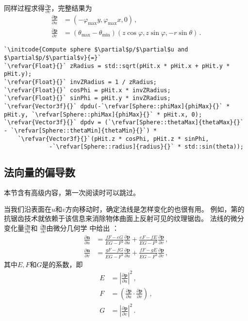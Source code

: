 同样过程求得$\displaystyle\frac{\partial \bm p}{\partial v}$，完整结果为
\begin{align*}
    \frac{\partial \bm p}{\partial u} & =(-\varphi_{\max}y,\varphi_{\max}x,0)\, ,                                  \\
    \frac{\partial \bm p}{\partial v} & =(\theta_{\max}-\theta_{\min})(z\cos\varphi,z\sin\varphi,-r\sin\theta)\, .
\end{align*}
\begin{lstlisting}
`\initcode{Compute sphere $\partial$p/$\partial$u and $\partial$p/$\partial$v}{=}`
`\refvar{Float}{}` zRadius = std::sqrt(pHit.x * pHit.x + pHit.y * pHit.y);
`\refvar{Float}{}` invZRadius = 1 / zRadius;
`\refvar{Float}{}` cosPhi = pHit.x * invZRadius;
`\refvar{Float}{}` sinPhi = pHit.y * invZRadius;
`\refvar{Vector3f}{}` dpdu(-`\refvar[Sphere::phiMax]{phiMax}{}` * pHit.y, `\refvar[Sphere::phiMax]{phiMax}{}` * pHit.x, 0);
`\refvar{Vector3f}{}` dpdv = (`\refvar[Sphere::thetaMax]{thetaMax}{}` - `\refvar[Sphere::thetaMin]{thetaMin}{}`) *
    `\refvar{Vector3f}{}`(pHit.z * cosPhi, pHit.z * sinPhi,
             -`\refvar[Sphere::radius]{radius}{}` * std::sin(theta));
\end{lstlisting}

\subsection{法向量的偏导数}\label{sub:法向量的偏导数}
\begin{remark}
    本节含有高级内容，第一次阅读时可以跳过。
\end{remark}

当我们沿表面在$u$和$v$方向移动时，确定法线是怎样变化的也很有用。
例如，第的抗锯齿技术就依赖于该信息来消除物体曲面上反射可见的纹理锯齿。
法线的微分变化量$\displaystyle\frac{\partial \bm n}{\partial u}$和
$\displaystyle\frac{\partial \bm n}{\partial v}$由微分几何学
中给出
：
\begin{align*}
    \frac{\partial \bm n}{\partial u} & =\frac{fF-eG}{EG-F^2}\frac{\partial \bm p}{\partial u}+\frac{eF-fE}{EG-F^2}\frac{\partial \bm p}{\partial v}\, , \\
    \frac{\partial \bm n}{\partial v} & =\frac{gF-fG}{EG-F^2}\frac{\partial \bm p}{\partial u}+\frac{fF-gE}{EG-F^2}\frac{\partial \bm p}{\partial v}\, ,
\end{align*}
其中$E,F$和$G$是的系数，即
\begin{align*}
    E & =\left|\frac{\partial \bm p}{\partial u}\right|^2\, ,                                     \\
    F & =\left(\frac{\partial \bm p}{\partial u}\cdot\frac{\partial \bm p}{\partial v}\right)\, , \\
    G & =\left|\frac{\partial \bm p}{\partial v}\right|^2\, .
\end{align*}

